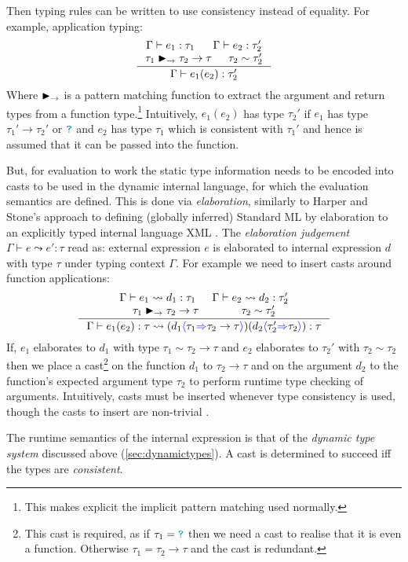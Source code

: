 Then typing rules can be written to use consistency instead of equality. For example, application typing:
\[\inference{\Gamma \vdash e_1 : \tau_1 & \Gamma \vdash e_2 : \tau_2'\\ \tau_1 \funmatch \tau_2 \to \tau & \tau_2 \sim \tau_2'}{\Gamma \vdash e_1(e_2) : \tau_2'}\]
Where $\blacktriangleright_\rightarrow$ is a pattern matching function to extract the argument and return types from a function type.\footnote{This makes explicit the implicit pattern matching used normally.}
Intuitively, $e_1(e_2)$ has type $\tau_2'$ if $e_1$ has type $\tau_1' \to \tau_2'$ or ${\color{teal}\texttt{?}}$ and $e_2$ has type $\tau_1$ which is consistent with $\tau_1'$ and hence is assumed that it can be passed into the function.

But, for evaluation to work the static type information needs to be encoded into casts to be used in the dynamic internal language, for which the evaluation semantics are defined. This is done via \textit{elaboration}, similarly to Harper and Stone's approach to defining (globally inferred) Standard ML \cite{StandardMLTypeTheory} by elaboration to an explicitly typed internal language XML \cite{CoreXML}. The \textit{elaboration judgement} $\Gamma \vdash e \leadsto e' : \tau$ read as: external expression $e$ is elaborated to internal expression $d$ with type $\tau$ under typing context $\Gamma$. For example we need to insert casts around function applications:
\[\inference{\Gamma \vdash e_1 \leadsto d_1 : \tau_1 & \Gamma \vdash e_2 \leadsto d_2 : \tau_2' \\ \tau_1 \funmatch \tau_2 \to \tau  & \tau_2 \sim \tau_2'}{\Gamma \vdash e_1(e_2) : \tau \leadsto (d_1\scast{\tau_1}{\tau_2 \to \tau})(d_2\scast{\tau_2'}{\tau_2}) : \tau}\]
If, $e_1$ elaborates to $d_1$ with type $\tau_1 \sim \tau_2 \to \tau$ and $e_2$ elaborates to $\tau_2'$ with $\tau_2 \sim \tau_2$ then we place a cast\footnote{This cast is required, as if $\tau_1 = {\color{teal}\texttt{?}}$ then we need a cast to realise that it is even a function. Otherwise $\tau_1 = \tau_2 \to \tau$ and the cast is redundant.} on the function $d_1$ to $\tau_2 \to \tau$ and on the argument $d_2$ to the function's expected argument type $\tau_2$ to perform runtime type checking of arguments.
Intuitively, casts must be inserted whenever type consistency is used, though the casts to insert are non-trivial \cite{Gradualizer}.

The runtime semantics of the internal expression is that of the \textit{dynamic type system} discussed above (\ref{sec:dynamictypes}). A cast is determined to succeed iff the types are \textit{consistent}.

